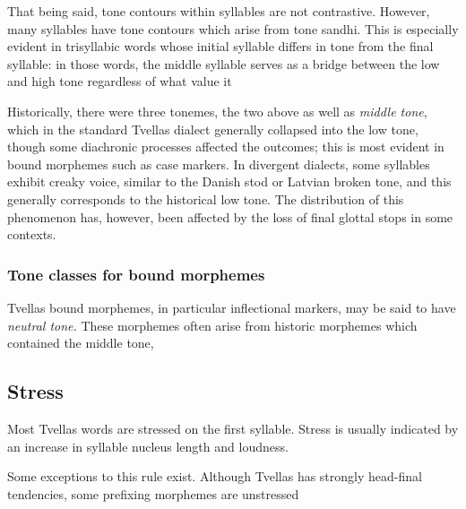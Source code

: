 That being said, tone contours within syllables are not contrastive. However, many syllables have
tone contours which arise from tone sandhi. This is especially evident in trisyllabic words whose
initial syllable differs in tone from the final syllable: in those words, the middle syllable
serves as a bridge between the low and high tone regardless of what value it

Historically, there were three tonemes, the two above as well as \textit{middle tone}, which in the
standard Tvellas dialect generally collapsed into the low tone, though some diachronic processes
affected the outcomes; this is most evident in bound morphemes such as case markers. In divergent
dialects, some syllables exhibit creaky voice, similar to the Danish stod or Latvian broken tone,
and this generally corresponds to the historical low tone. The distribution of this phenomenon has,
however, been affected by the loss of final glottal stops in some contexts.

\subsubsection{Tone classes for bound morphemes}

Tvellas bound morphemes, in particular inflectional markers, may be said to have \textit{neutral
tone.} These morphemes often arise from historic morphemes which contained the middle tone, 

\subsection{Stress}

Most Tvellas words are stressed on the first syllable. Stress is usually indicated by an increase in
syllable nucleus length and loudness.

Some exceptions to this rule exist. Although Tvellas has strongly head-final tendencies, some
prefixing morphemes are unstressed
